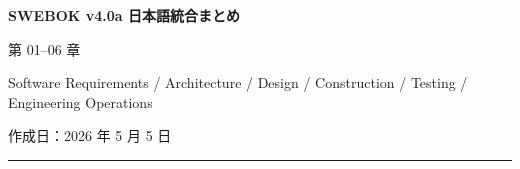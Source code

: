 \documentclass[a4paper,11pt]{ltjsarticle}
\begin{document}
\thispagestyle{empty}

\begin{center}

{\LARGE\bfseries SWEBOK v4.0a 日本語統合まとめ}\par\vspace{1em}

{\Large 第 01--06 章}\par\vspace{0.8em}

{\large Software Requirements / Architecture / Design / Construction / Testing / Engineering Operations}\par\vspace{1em}

{作成日：2026 年 5 月 5 日}\par

\end{center}

\vspace{1em}\hrule\vspace{0.8em}

\tableofcontents






























\end{document}
